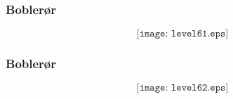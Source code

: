 \documentclass[aspectratio=169,xcolor=dvipsnames]{beamer}
\begin{document}
%
%
\begin{frame}
	\frametitle{Boblerør}

	$$\texttt{[image: level61.eps]}$$
\end{frame}

%
%
%
%
\begin{frame}
	\frametitle{Boblerør}

	$$\texttt{[image: level62.eps]}$$
\end{frame}
%
%
\end{document}
